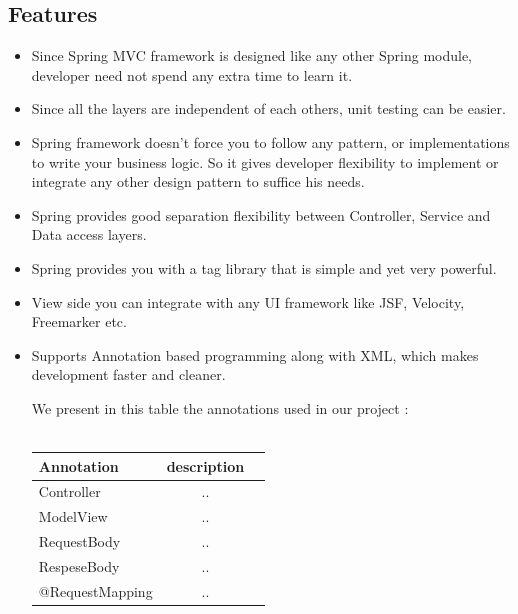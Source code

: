 \documentclass[12pt]{article}
\begin{document}
\subsection{Features}
\begin{itemize}
	\item Since Spring MVC framework is designed like any other Spring module, developer need not spend any extra time to learn it.
	\item Since all the layers are independent of each others, unit testing can be easier.
	\item Spring framework doesn’t force you to follow any pattern, or implementations to write your business logic. So it gives developer flexibility to implement or integrate any other design pattern to suffice his needs.
	\item Spring provides good separation flexibility between Controller, Service and Data access layers.
	\item Spring provides you with a tag library that is simple and yet very powerful.
	\item View side you can integrate with any UI framework like JSF, Velocity, Freemarker etc.
	\item Supports Annotation based programming along with XML, which makes development faster and cleaner.
	
	We present in this table the annotations used in our project :
	\\
	\\
	\begin{tabular}{|l|c|r|}
		\hline
		\textbf{Annotation} & \textbf{description }\\
		\hline
		Controller & .. \\
		ModelView & ..  \\
		RequestBody & .. \\
		RespeseBody & ..  \\	
	    @RequestMapping & .. \\
		\hline
	\end{tabular}
	

\end{itemize} 
\end{document}
